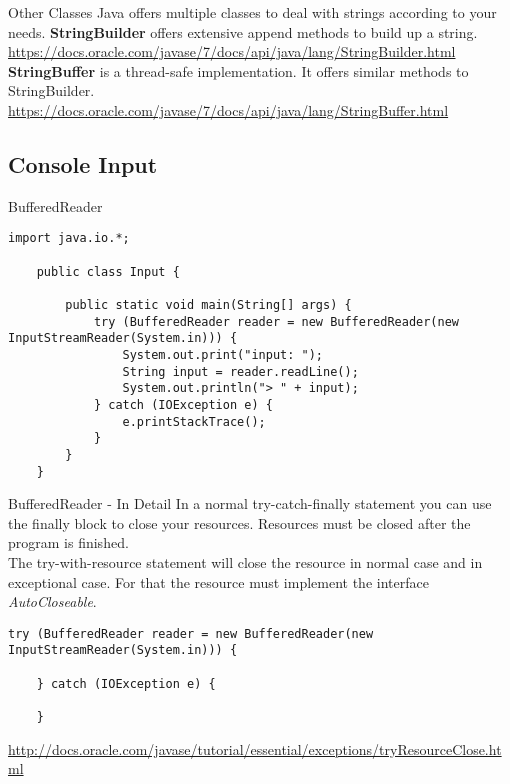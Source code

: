 \begin{frame}{Other Classes}
	Java offers multiple classes to deal with strings according to your needs.
	\vfill
	\textbf{StringBuilder} offers extensive append methods to build up a string.\\
	\scriptsize
	\url{https://docs.oracle.com/javase/7/docs/api/java/lang/StringBuilder.html}
	\normalsize
	\vfill
	\textbf{StringBuffer} is a thread-safe implementation. 
	It offers similar methods to StringBuilder. \\
	\scriptsize
	\url{https://docs.oracle.com/javase/7/docs/api/java/lang/StringBuffer.html}
	\normalsize
\end{frame}

\subsection{Console Input}
\begin{frame}[fragile]{BufferedReader}
	\begin{lstlisting}[basicstyle=\ttfamily\scriptsize]
	import java.io.*;

	public class Input {
	
	    public static void main(String[] args) {
	        try (BufferedReader reader = new BufferedReader(new InputStreamReader(System.in))) {
	            System.out.print("input: ");
	            String input = reader.readLine();
	            System.out.println("> " + input);
	        } catch (IOException e) {
	            e.printStackTrace();
	        }
	    }
	}
	\end{lstlisting}
\end{frame}


\begin{frame}[fragile]{BufferedReader - In Detail}
	In a normal try-catch-finally statement you can use the finally block to close your resources.
	Resources must be closed after the program is finished.\\
	The try-with-resource statement will close the resource in normal case and in exceptional case.
	For that the resource must implement the interface \emph{AutoCloseable}.
	\begin{lstlisting}[basicstyle=\ttfamily\scriptsize]
	try (BufferedReader reader = new BufferedReader(new InputStreamReader(System.in))) {
	    
	} catch (IOException e) {
	
	}
	\end{lstlisting}	
	\scriptsize
	\url{http://docs.oracle.com/javase/tutorial/essential/exceptions/tryResourceClose.html}
	\normalsize
\end{frame}

